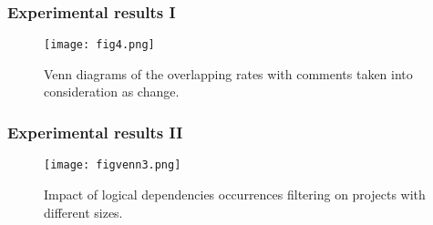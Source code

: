 \documentclass{beamer}
\begin{document}

 \begin{frame}
\frametitle{Experimental results I}

\begin{center}
     \begin{figure}
	\texttt{[image: fig4.png]}
	\caption{\label{fig:fig44}Venn diagrams of the overlapping rates with comments taken into consideration as change.}
     \end{figure}
\end{center}
\centering
{}
\end{frame}


 \begin{frame}
\frametitle{Experimental results II}

\begin{center}
     \begin{figure}
	\texttt{[image: figvenn3.png]}
	\caption{\label{fig:figvenn}Impact of logical dependencies occurrences filtering on projects with different sizes.}
     \end{figure}
\end{center}

\end{frame}

\end{document}
